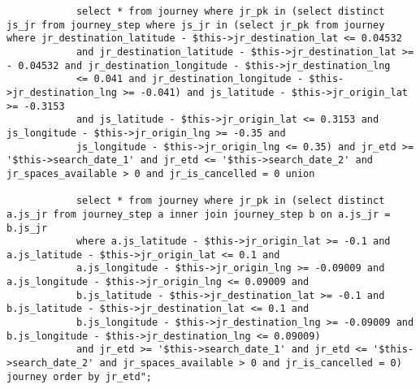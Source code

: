 \begin{lstlisting}
            select * from journey where jr_pk in (select distinct js_jr from journey_step where js_jr in (select jr_pk from journey where jr_destination_latitude - $this->jr_destination_lat <= 0.04532
            and jr_destination_latitude - $this->jr_destination_lat >= - 0.04532 and jr_destination_longitude - $this->jr_destination_lng
            <= 0.041 and jr_destination_longitude - $this->jr_destination_lng >= -0.041) and js_latitude - $this->jr_origin_lat >= -0.3153
            and js_latitude - $this->jr_origin_lat <= 0.3153 and js_longitude - $this->jr_origin_lng >= -0.35 and
            js_longitude - $this->jr_origin_lng <= 0.35) and jr_etd >= '$this->search_date_1' and jr_etd <= '$this->search_date_2' and jr_spaces_available > 0 and jr_is_cancelled = 0 union
                
            select * from journey where jr_pk in (select distinct a.js_jr from journey_step a inner join journey_step b on a.js_jr = b.js_jr 
            where a.js_latitude - $this->jr_origin_lat >= -0.1 and a.js_latitude - $this->jr_origin_lat <= 0.1 and 
            a.js_longitude - $this->jr_origin_lng >= -0.09009 and a.js_longitude - $this->jr_origin_lng <= 0.09009 and 
            b.js_latitude - $this->jr_destination_lat >= -0.1 and b.js_latitude - $this->jr_destination_lat <= 0.1 and 
            b.js_longitude - $this->jr_destination_lng >= -0.09009 and b.js_longitude - $this->jr_destination_lng <= 0.09009)
            and jr_etd >= '$this->search_date_1' and jr_etd <= '$this->search_date_2' and jr_spaces_available > 0 and jr_is_cancelled = 0) journey order by jr_etd";
\end{lstlisting}

